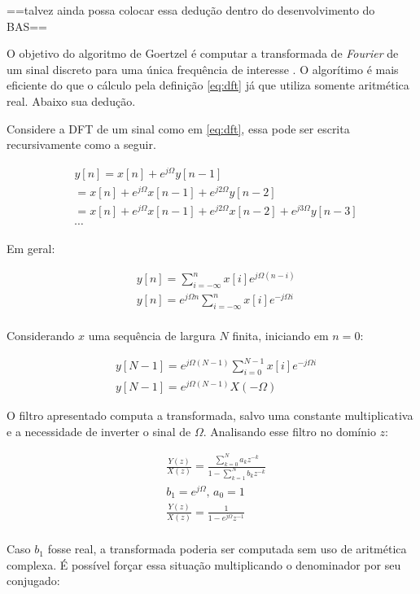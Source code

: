 ==talvez ainda possa colocar essa dedução dentro do desenvolvimento do BAS==

O objetivo do algoritmo de Goertzel é computar a transformada de \textit{Fourier} de um sinal discreto para uma única frequência de interesse \cite{Goertzel1958}. O algorítimo é mais eficiente do que o cálculo pela definição \eqref{eq:dft} já que utiliza somente aritmética real. Abaixo sua dedução.

Considere a \ac{DFT} de um sinal como em \eqref{eq:dft}, essa pode ser escrita recursivamente como a seguir. 

\begin{align*}
    &y[n] = x[n] + e^{j\Omega}y[n-1]\\
    &= x[n] + e^{j\Omega}x[n-1] + e^{j2\Omega}y[n-2]\\
    &= x[n] + e^{j\Omega}x[n-1] + e^{j2\Omega}x[n-2] + 
    e^{j3\Omega}y[n-3]\\
    & \cdots
\end{align*}

Em geral:

\begin{align*}
    &y[n] = \sum_{i = -\infty}^{n}x[i]e^{j\Omega(n-i)}\\
    &y[n] = e^{j\Omega n}\sum_{i = -\infty}^{n}x[i]e^{-j\Omega i}\\
\end{align*}

Considerando $x$ uma sequência de largura $N$ finita, iniciando em $n=0$:

\begin{align*}
    &y[N-1] = e^{j\Omega (N-1)}\sum_{i = 0}^{N-1}x[i]e^{-j\Omega i}\\
    &y[N-1] = e^{j\Omega (N-1)}X(-\Omega)
\end{align*}
    
O filtro apresentado computa a transformada, salvo uma constante multiplicativa e a necessidade de inverter o sinal de \(\Omega\). Analisando esse filtro no domínio \(z\):

\begin{align*}
    &\frac{Y(z)}{X(z)} = \frac{\sum_{k = 0}^N a_k z^{-k}}{1-\sum_{k=1}^N b_k z^{-k}}\\
    &b_1 = e^{j\Omega},\, a_0 = 1\\
    &\frac{Y(z)}{X(z)} = \frac{1}{1 - e^{j\Omega}z^{-1}}\\
\end{align*}

Caso $b_1$ fosse real, a transformada poderia ser computada sem uso de aritmética complexa. É possível forçar essa situação multiplicando o denominador por seu conjugado:

